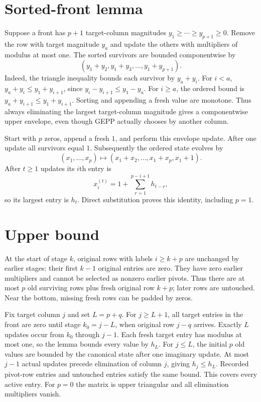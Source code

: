 \documentclass[11pt]{article}
\begin{document}
\section{Sorted-front lemma}
Suppose a front has $p+1$ target-column magnitudes $y_1\ge\cdots\ge y_{p+1}\ge0$. Remove the row with target magnitude $y_a$ and update the others with multipliers of modulus at most one. The sorted survivors are bounded componentwise by
\[
(y_1+y_2,y_1+y_3,\ldots,y_1+y_{p+1}).
\]
Indeed, the triangle inequality bounds each survivor by $y_a+y_i$. For $i<a$, $y_a+y_i\le y_1+y_{i+1}$, since $y_i-y_{i+1}\le y_1-y_a$. For $i\ge a$, the ordered bound is $y_a+y_{i+1}\le y_1+y_{i+1}$. Sorting and appending a fresh value are monotone. Thus always eliminating the largest target-column magnitude gives a componentwise upper envelope, even though GEPP actually chooses by another column.

Start with $p$ zeros, append a fresh $1$, and perform this envelope update. After one update all survivors equal $1$. Subsequently the ordered state evolves by
\[
(x_1,\ldots,x_p)\mapsto(x_1+x_2,\ldots,x_1+x_p,x_1+1).
\]
After $t\ge1$ updates its $i$th entry is
\[
x_i^{(t)}=1+\sum_{r=1}^{p-i+1}h_{t-r},
\]
so its largest entry is $h_t$. Direct substitution proves this identity, including $p=1$.
\section{Upper bound}
At the start of stage $k$, original rows with labels $i\ge k+p$ are unchanged by earlier stages: their first $k-1$ original entries are zero. They have zero earlier multipliers and cannot be selected as nonzero earlier pivots. Thus there are at most $p$ old surviving rows plus fresh original row $k+p$; later rows are untouched. Near the bottom, missing fresh rows can be padded by zeros.

Fix target column $j$ and set $L=p+q$. For $j\ge L+1$, all target entries in the front are zero until stage $k_0=j-L$, when original row $j-q$ arrives. Exactly $L$ updates occur from $k_0$ through $j-1$. Each fresh target entry has modulus at most one, so the lemma bounds every value by $h_L$. For $j\le L$, the initial $p$ old values are bounded by the canonical state after one imaginary update. At most $j-1$ actual updates precede elimination of column $j$, giving $h_j\le h_L$. Recorded pivot-row entries and untouched entries satisfy the same bound. This covers every active entry. For $p=0$ the matrix is upper triangular and all elimination multipliers vanish.
\end{document}
